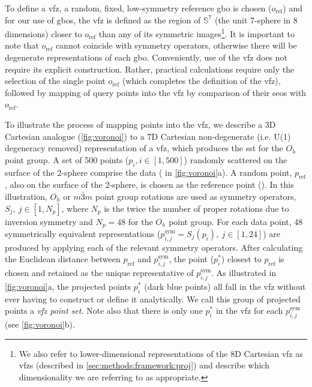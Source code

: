 \documentclass[final,twocolumn,12pt]{elsarticle}
\begin{document}
To define a \gls{vfz}, a random, fixed, low-symmetry reference \gls{gbo} is chosen ($o_{\text{ref}}$) and for our use of \glspl{gbo}, the \gls{vfz} is defined as the region of $\mathbb{S}^7$ (the unit 7-sphere in 8 dimensions) closer to $o_{\text{ref}}$ than any of its symmetric images\footnote{We also refer to lower-dimensional representations of the 8D Cartesian \gls{vfz} as \glspl{vfz} (described in \cref{sec:methods:framework:proj}) and describe which dimensionality we are referring to as appropriate. }. It is important to note that $o_{\text{ref}}$ cannot coincide with symmetry operators, otherwise there will be degenerate representations of each \gls{gbo}. Conveniently, use of the \gls{vfz} does not require its explicit construction. Rather, practical calculations require only the selection of the single point $o_{\text{ref}}$ (which completes the definition of the \gls{vfz}), followed by mapping of query points into the \gls{vfz} by comparison of their \glspl{seo} with $o_{\text{ref}}$.

To illustrate the process of mapping points into the \gls{vfz}, we describe a 3D Cartesian analogue (\cref{fig:voronoi}) to a 7D Cartesian non-degenerate (i.e. U(1) degeneracy removed) representation of a \gls{vfz}, which produces the \gls{sst} \cite{patalaSymmetriesRepresentationGrain2013} for the $O_h$ point group. A set of \num{500} points ($p_i, i\in[1,500]$) randomly scattered on the surface of the 2-sphere comprise the data (\startpt{} in \cref{fig:voronoi}a). A random point, $p_{\text{ref}}$, also on the surface of the 2-sphere, is chosen as the reference point (). In this illustration, $O_h$ or $m\bar{3}m$ point group rotations are used as symmetry operators, $S_j,\ j\in[1,N_p]$, where $N_p$ is the twice the number of proper rotations due to inversion symmetry and $N_p = 48$ for the $O_h$  point group. For each data point, \num{48} symmetrically equivalent representations ($p^{\text{sym}}_{i,j} = S_j(p_i),\ j\in[1,24]$) are produced by applying each of the relevant symmetry operators. After calculating the Euclidean distance between $p_{\text{ref}}$ and $p^{\text{sym}}_{i,j}$, the point ($p^{*}_i$) closest to $p_{\text{ref}}$ is chosen and retained as the unique representative of $p^{\text{sym}}_{i,j}$. As illustrated in \cref{fig:voronoi}a, the projected points $p^{*}_i$ (dark blue points) all fall in the \gls{vfz} without ever having to construct or define it analytically. We call this group of projected points a \textit{\gls{vfz} point set}. Note also that there is only one $p^{*}_i$ in the \gls{vfz} for each $p^{\text{sym}}_{i,j}$ (see \cref{fig:voronoi}b).
\end{document}

